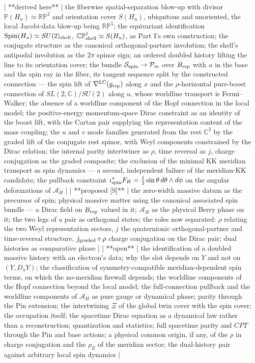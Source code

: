 | **derived here** | the fiberwise spatial-separation blow-up with divisor $\mathbb P(H_u)\simeq\mathbb{RP}^2$ and orientation cover $S(H_u)$, ubiquitous and unoriented, the local Jacobi-data blow-up being $\mathbb{RP}^5$; the equivariant identification ${\rm Spin}(H_u)\simeq SU(2)_{\rm shell}$, $\mathbb{CP}^1_{\rm shell}\simeq S(H_u)$, as Part I's own construction; the conjugate structure as the canonical orthogonal-partner involution; the shell's antipodal involution as the $2\pi$ spinor sign; an ordered doubled history lifting the line to its orientation cover; the bundle $\mathcal S_{\rm spin}\to\mathcal P_m$ over $B_{\rm rep}$ with $u$ in the base and the spin ray in the fiber, its tangent sequence split by the constructed connection — the spin lift of $\nabla^{\rm LC}(g_{\rm rep})$ along $x$ and the $\rho$-horizontal pure-boost connection of $SL(2,\mathbb C)/SU(2)$ along $u$, whose worldline transport is Fermi–Walker; the absence of a worldline component of the Hopf connection in the local model; the positive-energy momentum-space Dirac constraint as an identity of the boost lift, with the Cartan pair supplying the representation content of the mass coupling; the $u$ and $v$ mode families generated from the rest $\mathbb C^2$ by the graded lift of the conjugate rest spinor, with Weyl components constrained by the Dirac relation; the internal parity intertwiner as $\rho$, time reversal as $j$, charge conjugation as the graded composite; the exclusion of the minimal KK meridian transport as spin dynamics — a second, independent failure of the meridian-KK candidate; the pullback constraint $\iota_{\rm spin}^*F_H = \tfrac12\sin\theta\,d\theta\wedge d\phi$ on the angular deformations of $\mathcal A_H$ |
| **proposed [S]** | the zero-width massive datum as the precursor of spin; physical massive matter using the canonical associated spin bundle — a Dirac field on $B_{\rm rep}$ valued in it; $\mathcal A_H$ as the physical Berry phase on it; the two legs of a pair as orthogonal states; the roles now separated: $\rho$ relating the two Weyl representation sectors, $j$ the quaternionic orthogonal-partner and time-reversal structure, $j_{\rm graded}\circ\rho$ charge conjugation on the Dirac pair; dual histories as comparative phase |
| **open** | the identification of a doubled massive history with an electron's data; why the slot depends on $Y$ and not on $(Y,D_uY)$; the classification of symmetry-compatible meridian-dependent spin terms, on which the no-meridian firewall depends; the worldline components of the Hopf connection beyond the local model; the full-connection pullback and the worldline components of $\mathcal A_H$ as pure gauge or dynamical phase; parity through the Pin extension; the intertwining $\Xi$ of the global twin cover with the spin cover; the occupation itself; the spacetime Dirac equation as a dynamical law rather than a reconstruction; quantization and statistics; full spacetime parity and $CPT$ through the Pin and base actions; a physical common origin, if any, of the $\rho$ in charge conjugation and the $\rho_E$ of the meridian sector; the dual-history pair against arbitrary local spin dynamics |

